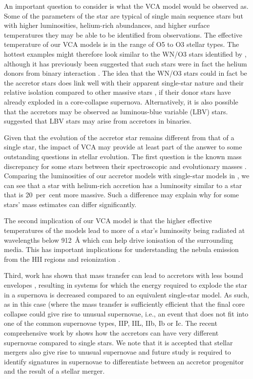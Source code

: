 An important question to consider is what the VCA model would be observed as. Some of the parameters of the star are typical of single main sequence stars but with higher luminosities, helium-rich abundances, and higher surface temperatures they may be able to be identified from observations. The effective temperature of our VCA models is in the range of O5 to O3 stellar types. The hottest examples might therefore look similar to the WN/O3 stars identified by \citet{Massey:2023}, although it has previously been suggested that such stars were in fact the helium donors from binary interaction \citep{Gotberg:2018, Smith:2018}. The idea that the WN/O3 stars could in fact be the accretor stars does link well with their apparent single-star nature \citep{Massey:2023} and their relative isolation compared to other massive stars \citep{Smith:2018}, if their donor stars have already exploded in a core-collapse supernova. Alternatively, it is also possible that the accretors may be observed as luminous-blue variable (LBV) stars. \citet{Smith:2012} suggested that LBV stars may arise from accretors in binaries.

Given that the evolution of the accretor star remains different from that of a single star, the impact of VCA may provide at least part of the answer to some outstanding questions in stellar evolution. The first question is the known mass discrepancy for some stars between their spectroscopic and evolutionary masses \citep[e.g.][]{Herrero:1992, Massey:2009, Bouret:2013, Massey:2013, McEvoy:2015, Markova:2018, Ramachandran:2018, Bestenlehner:2020}. Comparing the luminosities of our accretor models with single-star models in , we can see that a star with helium-rich accretion has a luminosity similar to a star that is 20~per~cent more massive. Such a difference may explain why for some stars' mass estimates can differ significantly.

The second implication of our VCA model is that the higher effective temperatures of the models lead to more of a star's luminosity being radiated at wavelengths below \SI{912}{\angstrom} which can help drive ionisation of the surrounding media. This has important implications for understanding the nebula emission from the HII regions and reionization \citep[e.g.,][]{Stanway:2016, Eldridge:2022, Ghodla:2023}.

Third, work has shown that mass transfer can lead to accretors with less bound envelopes \citep{Laplace:2021, Renzo:2023}, resulting in systems for which the energy required to explode the star in a supernova is decreased compared to an equivalent single-star model. As such, as in this case (where the mass transfer is sufficiently efficient that the final core collapse could give rise to unusual supernovae, i.e., an event that does not fit into one of the common supernovae types, IIP, IIL, IIb, Ib or Ic. The recent comprehensive work by \citet{Schneider:2025} shows how the accretors can have very different supernovae compared to single stars. We note that it is accepted that stellar mergers also give rise to unusual supernovae \citep[e.g.][]{Menon:2019} and future study is required to identify signatures in supernovae to differentiate between an accretor progenitor and the result of a stellar merger.

